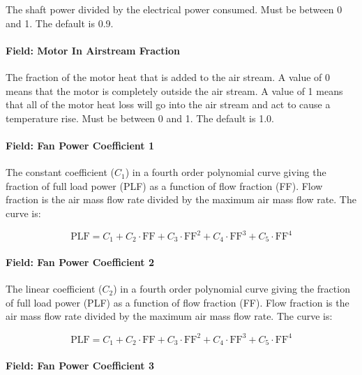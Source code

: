 The shaft power divided by the electrical power consumed. Must be between 0 and 1. The default is 0.9.

\paragraph{Field: Motor In Airstream Fraction}\label{field-motor-in-airstream-fraction-2}

The fraction of the motor heat that is added to the air stream. A value of 0 means that the motor is completely outside the air stream. A value of 1 means that all of the motor heat loss will go into the air stream and act to cause a temperature rise. Must be between 0 and 1. The default is 1.0.

\paragraph{Field: Fan Power Coefficient 1}\label{field-fan-power-coefficient-1}

The constant coefficient (\(C_1\)) in a fourth order polynomial curve giving the fraction of full load power (PLF) as a function of flow fraction (FF). Flow fraction is the air mass flow rate divided by the maximum air mass flow rate. The curve is:

\begin{equation}
\mathrm{PLF} = C_1 + C_2 \cdot \mathrm{FF} + C_3 \cdot \mathrm{FF}^2 + C_4 \cdot \mathrm{FF}^3 + C_5 \cdot \mathrm{FF}^4
\end{equation}

\paragraph{Field: Fan Power Coefficient 2}\label{field-fan-power-coefficient-2}

The linear coefficient (\(C_2\)) in a fourth order polynomial curve giving the fraction of full load power (PLF) as a function of flow fraction (FF). Flow fraction is the air mass flow rate divided by the maximum air mass flow rate. The curve is:

\begin{equation}
\mathrm{PLF} = C_1 + C_2 \cdot \mathrm{FF} + C_3 \cdot \mathrm{FF}^2 + C_4 \cdot \mathrm{FF}^3 + C_5 \cdot \mathrm{FF}^4
\end{equation}

\paragraph{Field: Fan Power Coefficient 3}\label{field-fan-power-coefficient-3}

